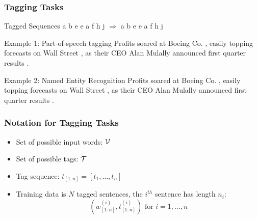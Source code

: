 \begin{frame}
\frametitle{Tagging Tasks}
\begin{block}{Tagged Sequences}
a b e e a f h j $\Rightarrow$ a b e e a f h j
\end{block}
\pause
\begin{alertblock}{Example 1: Part-of-speech tagging}
Profits soared at Boeing Co. ,\postag{,} easily topping forecasts on Wall Street ,\postag{,} as their CEO Alan Mulally announced first quarter results .
\end{alertblock}
\pause
\begin{alertblock}{Example 2: Named Entity Recognition}
Profits soared at Boeing Co. , easily topping forecasts on Wall Street , as their CEO Alan Mulally announced first quarter results .
\end{alertblock}
\end{frame}


\begin{frame}
\frametitle{Notation for Tagging Tasks}
\begin{itemize}[<+->]
\item Set of possible input words: ${\cal V}$
\item Set of possible tags: ${\cal T}$
\item Tag sequence: $t_{[1:n]} = [t_1, \ldots, t_n]$
\item Training data is $N$ tagged sentences, the $i^{th}$ sentence has length $n_i$:
\[ (w_{[1:n]}^{(i)}, t_{[1:n]}^{(i)}) \textrm{ for } i = 1, \ldots, n \]
\end{itemize}
\end{frame}

